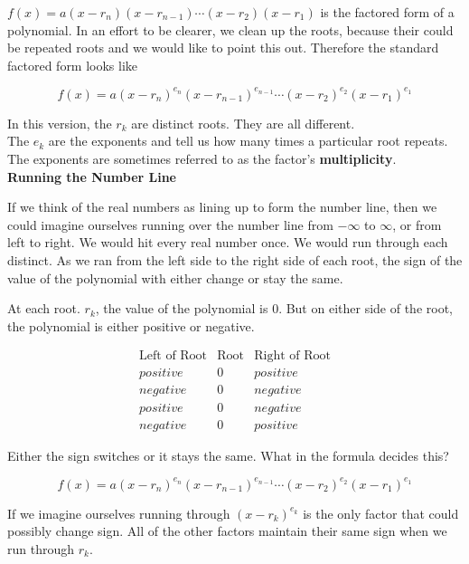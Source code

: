 \documentclass{ximera}
\begin{document}
$f(x) = a (x-r_n)(x-r_{n-1})  \cdots (x-r_2)(x-r_1)$ is the factored form of a polynomial.  In an effort to be clearer, we clean up the roots, because their could be repeated roots and we would like to point this out.  Therefore the standard factored form looks like




\[   f(x) = a (x-r_n)^{e_n} (x-r_{n-1})^{e_{n-1}}  \cdots (x-r_2)^{e_2} (x-r_1)^{e_1}  \]



In this version, the $r_k$ are distinct roots.  They are all different. \\
The $e_k$ are the exponents and tell us how many times a particular root repeats.  The exponents are sometimes referred to as the factor's \textbf{multiplicity}. \\



\textbf{\large Running the Number Line}

If we think of the real numbers as lining up to form the number line, then we could imagine ourselves running over the number line from $-\infty$ to $\infty$, or from left to right.  We would hit every real number once.  We would run through each distinct.  As we ran from the left side to the right side of each root, the sign of the value of the polynomial with either change or stay the same.

At each root. $r_k$, the value of the polynomial is $0$.  But on either side of the root, the polynomial is either positive or negative.


\[
\begin{array}{rcl}
\text{Left of Root}  & \text{Root}  & \text{Right of Root} \\
positive & 0 & positive \\
negative & 0 & negative \\
positive & 0 & negative \\
negative & 0 & positive
\end{array}
\]


Either the sign switches or it stays the same.  What in the formula decides this?



\[   f(x) = a (x-r_n)^{e_n} (x-r_{n-1})^{e_{n-1}}  \cdots (x-r_2)^{e_2} (x-r_1)^{e_1}  \]


If we imagine ourselves running through $(x-r_k)^{e_k}$ is the only factor that could possibly change sign.  All of the other factors maintain their same sign when we run through $r_k$.
\end{document}
